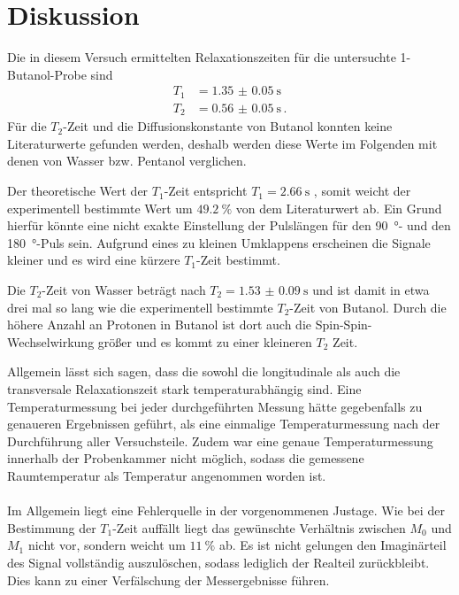 \section{Diskussion}
Die in diesem Versuch ermittelten Relaxationszeiten für die untersuchte 1-Butanol-Probe sind
\begin{align*}
  T_1 &= \SI{1.35(005)}{\second} \\
  T_2 &= \SI{0.56(005)}{\second} \, .
\end{align*}
Für die $T_2$-Zeit und die Diffusionskonstante von Butanol konnten keine Literaturwerte gefunden werden, deshalb werden diese Werte im Folgenden mit denen von Wasser bzw. Pentanol verglichen.

Der theoretische Wert der $T_1$-Zeit entspricht $T_1 = \SI{2.66}{\second}$ \cite{T1}, somit weicht der experimentell bestimmte Wert um $\SI{49.2}{\percent}$ von dem Literaturwert ab.
Ein Grund hierfür könnte eine nicht exakte Einstellung der Pulslängen für den \SI{90}{\degree}- und den \SI{180}{\degree}-Puls sein. Aufgrund eines zu kleinen Umklappens erscheinen die Signale kleiner und es wird eine kürzere $T_1$-Zeit bestimmt.

Die $T_2$-Zeit von Wasser beträgt nach \cite{chang} $T_2 = \SI{1.53(9)}{\second}$ und ist damit in etwa drei mal so lang wie die experimentell bestimmte $T_2$-Zeit von Butanol.
Durch die höhere Anzahl an Protonen in Butanol ist dort auch die Spin-Spin-Wechselwirkung größer und es kommt zu einer kleineren $T_2$ Zeit.

Allgemein lässt sich sagen, dass die sowohl die longitudinale als auch die transversale Relaxationszeit stark temperaturabhängig
sind. Eine Temperaturmessung bei jeder durchgeführten Messung hätte gegebenfalls zu genaueren Ergebnissen geführt,
als eine einmalige Temperaturmessung nach der Durchführung aller Versuchsteile.
Zudem war eine genaue Temperaturmessung innerhalb der Probenkammer nicht möglich, sodass die gemessene Raumtemperatur als
Temperatur angenommen worden ist. \\
\\
Im Allgemein liegt eine Fehlerquelle in der vorgenommenen Justage. Wie bei der Bestimmung der $T_1$-Zeit auffällt liegt
das gewünschte Verhältnis zwischen $M_0$ und $M_1$ nicht vor, sondern weicht um $\SI{11}{\percent}$ ab.
Es ist nicht gelungen den Imaginärteil des Signal vollständig auszulöschen, sodass lediglich der Realteil zurückbleibt.
Dies kann zu einer Verfälschung der Messergebnisse führen. \\


